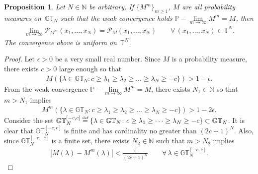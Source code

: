 \documentclass[pdftex]{sigma}
\numberwithin{equation}{section}
\newcommand\myeq{\mathrel{\stackrel{\makebox[0pt]{\mbox{\normalfont\tiny def}}}{=}}}
\newtheorem{prop}[thm]{Proposition}
\newcommand{\N}{\mathbb{N}}
\newcommand{\GT}{\mathbb{GT}}
\newcommand{\PPP}{\mathcal{P}}
\newcommand{\TT}{\mathbb{T}}
\begin{document}
\begin{prop}\label{prop:convergencemacdonalds}
Let $N\in\N$ be arbitrary. If $\{M^m\}_{m\geq 1}$, $M$ are all probability measures on~$\GT_N$ such that the weak convergence holds $\mathbb{P}-\lim\limits_{m\rightarrow\infty}{M^m} = M$, then{\samepage
\begin{gather}\label{eqn:convergencemacdonalds}
\lim_{m\rightarrow\infty}{\PPP_{M^m}(x_1, \dots, x_N)} = \PPP_M(x_1, \dots, x_N) \qquad \forall\, (x_1, \dots, x_N)\in\TT^N.
\end{gather}
The convergence above is uniform on~$\TT^N$.}
\end{prop}

\begin{proof}
Let $\epsilon > 0$ be a very small real number. Since $M$ is a probability measure, there exists $c>0$ large enough so that
\begin{gather}\label{eqn:eqnlemma1}
M\left( \{ \lambda \in \GT_N\colon c \geq \lambda_1 \geq \lambda_2 \geq \dots \geq \lambda_N \geq -c \} \right) > 1 - \epsilon.
\end{gather}
From the weak convergence $\mathbb{P}-\lim\limits_{m\rightarrow\infty}{M^m} = M$, there exists $N_1 \in \N$ so that $m > N_1$ implies
\begin{gather}\label{eqn:eqnlemma2}
M^m\left( \{ \lambda \in \GT_N\colon c \geq \lambda_1 \geq \lambda_2 \geq \dots \geq \lambda_N \geq -c \} \right) > 1 - 2\epsilon.
\end{gather}
Consider the set $\GT_N^{[-c, c]} \myeq \{\lambda\in\GT_N\colon c \geq \lambda_1 \geq \dots \geq \lambda_N \geq -c\}\subset\GT_N$. It is clear that $\GT_N^{[-c, c]}$ is f\/inite and has cardinality no greater than $(2c + 1)^N$. Also, since $\GT_N^{[-c,, c]}$ is a f\/inite set, there exists $N_2\in\N$ such that $m > N_2$ implies
\begin{gather}\label{eqn:eqnlemma3}
\left|M(\lambda) - M^m(\lambda)\right| < \frac{\epsilon}{(2c+1)^N} \qquad \forall\, \lambda\in\GT_N^{[-c, c]}.
\end{gather}


\end{proof}
\end{document}
